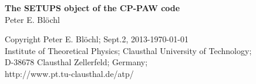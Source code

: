 \documentclass[11pt,a4paper]{report}
\begin{document}
\begin{titlepage}
\begin{center}
\vspace*{3.5cm}
{\huge \textbf{The SETUPS object of the CP-PAW code}}\\
\vspace{0.5cm}
{\large Peter E. Bl\"ochl}
\vspace{0.5cm} 
\end{center}

\vfill
\begin{center}
Copyright Peter E. Bl\"ochl; Sept.2, 2013-\today\\
{\small
Institute of Theoretical Physics;
Clausthal University of Technology;\\ 
D-38678 Clausthal Zellerfeld; Germany;\\
http://www.pt.tu-clausthal.de/atp/}
\end{center}
\end{titlepage}
\noindent            
\tableofcontents
\end{document}
